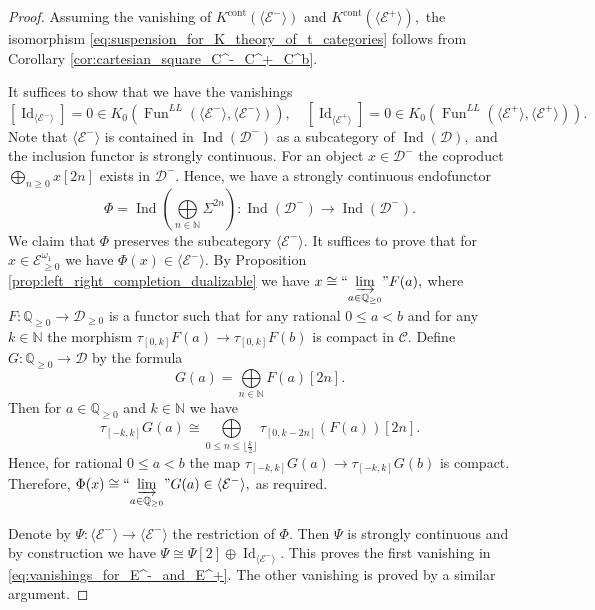 \documentclass[11pt,leqno]{amsart}
\numberwithin{equation}{section}
\def\N{\mathbb{N}}
\def\Q{\mathbb{Q}}
\newcommand{\indlim}[1][]{\mathop{\varinjlim}\limits_{#1}}
\newcommand{\inddlim}[1][]{{``{\indlim[#1]}"}}
\newcommand{\biggplus}[1][]{\mathop{\bigoplus}\limits_{#1}}
\newcommand{\cont}{\operatorname{cont}}
\newcommand{\cD}{{\mathcal D}}
\newcommand{\cC}{{\mathcal C}}
\newcommand{\cE}{{\mathcal E}}
\newcommand{\la}{\langle}
\newcommand{\ra}{\rangle}
\newcommand{\Fun}{\operatorname{Fun}}
\newcommand{\Id}{\operatorname{Id}}
\newcommand{\Ind}{\operatorname{Ind}}
\begin{document}
\begin{proof}
Assuming the vanishing of $K^{\cont}(\la \cE^-\ra)$ and $K^{\cont}(\la \cE^+\ra),$ the isomorphism \eqref{eq:suspension_for_K_theory_of_t_categories} follows from Corollary \ref{cor:cartesian_square_C^-_C^+_C^b}.

It suffices to show that we have the vanishings
\begin{equation}\label{eq:vanishings_for_E^-_and_E^+}
[\Id_{\la \cE^-\ra}]=0\in K_0(\Fun^{LL}(\la \cE^-\ra,\la \cE^-\ra)),\quad [\Id_{\la \cE^+\ra}]=0\in K_0(\Fun^{LL}(\la \cE^+\ra,\la \cE^+\ra)).
\end{equation}
Note that $\la\cE^-\ra$ is contained in $\Ind(\cD^-)$ as a subcategory of $\Ind(\cD),$ and the inclusion functor is strongly continuous. For an object $x\in\cD^-$ the coproduct $\biggplus[n\geq 0]x[2n]$ exists in $\cD^-.$ Hence, we have a strongly continuous endofunctor
\begin{equation*}
\Phi=\Ind(\biggplus[n\in\N]\Sigma^{2n}):\Ind(\cD^-)\to\Ind(\cD^-).\end{equation*}
We claim that $\Phi$ preserves the subcategory $\la \cE^-\ra.$ It suffices to prove that for $x\in\cE^{\omega_1}_{\geq 0}$ we have $\Phi(x)\in \la\cE^-\ra.$ By Proposition \ref{prop:left_right_completion_dualizable} we have $x\cong\inddlim[a\in\Q_{\geq 0}]F(a),$ where $F:\Q_{\geq 0}\to \cD_{\geq 0}$ is a functor such that for any rational $0\leq a<b$ and for any $k\in\N$ the morphism $\tau_{[0,k]}F(a)\to\tau_{[0,k]}F(b)$ is compact in $\cC.$ Define $G:\Q_{\geq 0}\to\cD$ by the formula \begin{equation*}
G(a) = \biggplus[n\in\N]F(a)[2n].
\end{equation*}
Then for $a\in\Q_{\geq 0}$ and $k\in\N$ we have 
\begin{equation*}
\tau_{[-k,k]}G(a)\cong\biggplus[0\leq n\leq \lfloor \frac{k}{2}\rfloor] \tau_{[0,k-2n]}(F(a))[2n].
\end{equation*} 
Hence, for rational $0\leq a<b$ the map $\tau_{[-k,k]}G(a)\to \tau_{[-k,k]}G(b)$
is compact. Therefore, $\Phi(x)\cong\inddlim[a\in\Q_{\geq 0}]G(a)\in\la\cE^-\ra,$ as required.
 
Denote by $\Psi:\la \cE^-\ra\to \la \cE^-\ra$ the restriction of $\Phi.$ Then $\Psi$ is strongly continuous and by construction we have $\Psi\cong\Psi[2]\oplus\Id_{\la \cE^-\ra}.$ This proves the first vanishing in \eqref{eq:vanishings_for_E^-_and_E^+}. The other vanishing is proved by a similar argument.\end{proof}
\end{document}
